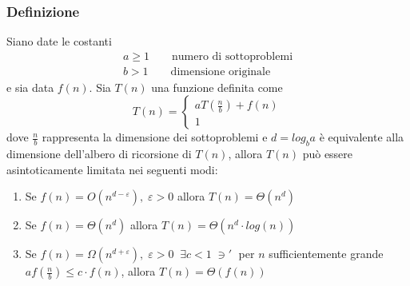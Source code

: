 \documentclass[italian]{article}
\newcommand{\taleche}{\;\ni'\;}
\newcommand{\varOmicron}{O}
\newcommand{\fn}{f(n)}
\let\oldexists\exists
\renewcommand{\exists}{\text{$\;\oldexists$}}
\begin{document}
\subsubsection{Definizione}
Siano date le costanti
\begin{gather*}
	a \geq 1 \qquad \text{numero di sottoproblemi} \\
	b > 1 \qquad \text{dimensione originale} 
\end{gather*}
e sia data $\fn$. Sia $T(n)$ una funzione definita come
\[
	T(n) =
	\begin{cases*}
		aT\left( \frac{n}{b} \right) + \fn \\
		1
	\end{cases*}
\]
dove $\frac{n}{b}$ rappresenta la dimensione dei sottoproblemi e $d = log_ba$ è equivalente alla dimensione dell'albero di ricorsione di $T(n)$, allora $T(n)$ può essere asintoticamente limitata nei seguenti modi:
\begin{enumerate}[label=\arabic*)]
	\item Se $\fn = \varOmicron(n^{d-\varepsilon}),\;\varepsilon > 0$ allora $T(n) = \varTheta(n^d)$
	\item Se $\fn = \varTheta(n^{d})$ allora $T(n) = \varTheta(n^d \cdot log(n))$
	\item Se $\fn = \varOmega(n^{d+\varepsilon}),\;\varepsilon > 0\;\exists c<1 \taleche $ per $n$ sufficientemente grande $af(\frac{n}{b}) \leq c\cdot \fn$, allora $T(n) = \varTheta(\fn)$
\end{enumerate}
\end{document}
